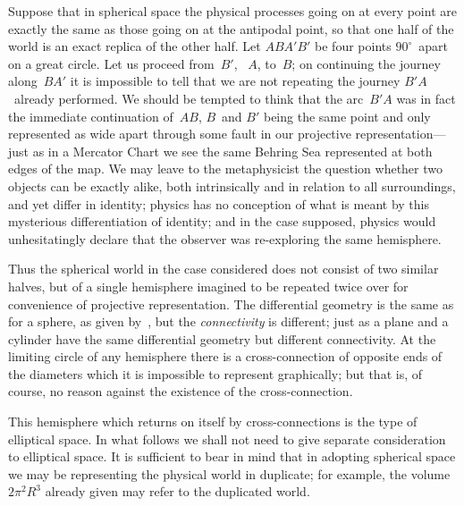 \documentclass[12pt]{book}
\begin{document}
Suppose that in spherical space the physical processes going on at every
point are exactly the same as those going on at the antipodal point, so that
one half of the world is an exact replica of the other half. Let $ABA'B'$ be
four points $90^{\circ}$~apart on a great circle. Let us proceed from~$B'$, ~$A$, to~$B$;
on continuing the journey along~$BA'$ it is impossible to tell that we are not
repeating the journey $B'A$~already performed. We should be tempted to think
that the arc~$B'A$ was in fact the immediate continuation of~$AB$, $B$~and $B'$
being the same point and only represented as wide apart through some fault
in our projective representation---just as in a Mercator Chart we see the same
Behring Sea represented at both edges of the map. We may leave to the
metaphysicist the question whether two objects can be exactly alike, both
intrinsically and in relation to all surroundings, and yet differ in identity;
physics has no conception of what is meant by this mysterious differentiation
of identity; and in the case supposed, physics would unhesitatingly declare
that the observer was re\hyp{}exploring the same hemisphere.

Thus the spherical world in the case considered does not consist of two
similar halves, but of a single hemisphere imagined to be repeated twice over
for convenience of projective representation. The differential geometry is the
same as for a sphere, as given by~, but the \emph{connectivity} is different; just
as a plane and a cylinder have the same differential geometry but different
connectivity. At the limiting circle of any hemisphere there is a cross\hyp{}connection
of opposite ends of the diameters which it is impossible to represent
graphically; but that is, of course, no reason against the existence of the
cross\hyp{}connection.

This hemisphere which returns on itself by cross\hyp{}con\-nec\-tions is the type
of elliptical space. In what follows we shall not need to give separate consideration
to elliptical space. It is sufficient to bear in mind that in adopting
spherical space we may be representing the physical world in duplicate; for
example, the volume $2\pi^{2} R^{3}$ already given may refer to the duplicated world.
\end{document}
